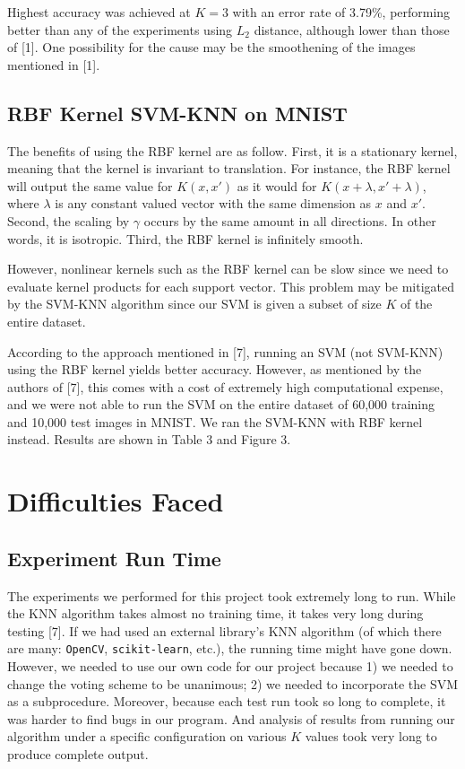 \documentclass[11pt,letterpaper]{article}
\begin{document}
Highest accuracy was achieved at $K=3$ with an error rate of 3.79\%, performing better than any of the experiments using $L_2$ distance, although lower than those of [1]. One possibility for the cause may be the smoothening of the images mentioned in [1].


\subsection{RBF Kernel SVM-KNN on MNIST}

The benefits of using the RBF kernel are as follow. First, it is a stationary kernel, meaning that the kernel is invariant to translation. For instance, the RBF kernel will output the same value for $K(x,x')$ as it would for $K(x+\lambda, x'+\lambda)$, where $\lambda$ is any constant valued vector with the same dimension as $x$ and $x'$. Second, the scaling by $\gamma$ occurs by the same amount in all directions. In other words, it is isotropic. Third, the RBF kernel is infinitely smooth.

However, nonlinear kernels such as the RBF kernel can be slow since we need to evaluate kernel products for each support vector. This problem may be mitigated by the SVM-KNN algorithm since our SVM is given a subset of size $K$ of the entire dataset.

According to the approach mentioned in [7], running an SVM (not SVM-KNN) using the RBF kernel yields better accuracy. However, as mentioned by the authors of [7], this comes with a cost of extremely high computational expense, and we were not able to run the SVM on the entire dataset of 60,000 training and 10,000 test images in MNIST. We ran the SVM-KNN with RBF kernel instead. Results are shown in Table 3 and Figure 3.

\section{Difficulties Faced}

\subsection{Experiment Run Time}

The experiments we performed for this project took extremely long to run. While the KNN algorithm takes almost no training time, it takes very long during testing [7]. If we had used an external library's KNN algorithm (of which there are many: {\tt OpenCV}, {\tt scikit-learn}, etc.), the running time might have gone down. However, we needed to use our own code for our project because 1) we needed to change the voting scheme to be unanimous; 2) we needed to incorporate the SVM as a subprocedure. Moreover, because each test run took so long to complete, it was harder to find bugs in our program. And analysis of results from running our algorithm under a specific configuration on various $K$ values took very long to produce complete output.
\end{document}
